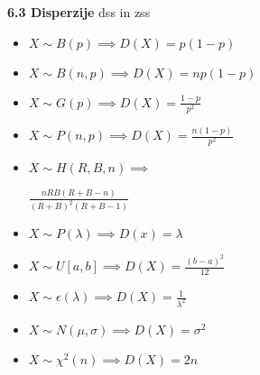 \documentclass{article}
\begin{document}
\begin{multicols}{2}
\textbf{6.3 Disperzije} dss in zss
\begin{itemize}
    \item \begin{math}
        X \sim B(p) \implies D(X) = p(1 - p)
    \end{math}
    \item \begin{math}
        X \sim B(n, p) \implies D(X) = np(1 - p)
    \end{math}
    \item \begin{math}
        X \sim G(p) \implies D(X) = \frac{1 - p}{p^2}
    \end{math}
    \item \begin{math}
        X \sim P(n, p) \implies D(X) = \frac{n(1 - p)}{p^2}
    \end{math}
    \item
    \begin{math}
        X \sim H(R, B, n) \implies
    \end{math}
    \begin{center}
        \begin{math}
            \frac{
                nRB(R + B - n)
            }{
                (R + B)^2 (R + B - 1)
            }
        \end{math}
    \end{center}
    \item \begin{math}
        X \sim P(\lambda) \implies D(x) = \lambda
    \end{math}
    \item \begin{math}
        X \sim U[a, b] \implies D(X) = \frac{(b - a)^2}{12}
    \end{math}
    \item  \begin{math}
        X \sim \epsilon(\lambda) \implies D(X) = \frac{1}{\lambda^2}
    \end{math}
    \item \begin{math}
        X \sim N(\mu, \sigma ) \implies D(X) = \sigma^2
    \end{math}
    \item \begin{math}
        X \sim \chi^{2}(n) \implies D(X) = 2n
    \end{math}
\end{itemize}


\end{multicols}
\end{document}
